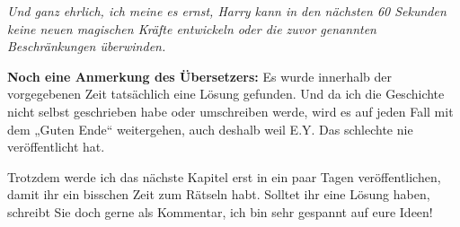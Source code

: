 \emph{Und ganz ehrlich, ich meine es ernst, Harry kann in den nächsten 60
Sekunden keine neuen magischen Kräfte entwickeln oder die zuvor genannten
Beschränkungen überwinden.}

\textbf{Noch eine Anmerkung des Übersetzers:}
Es wurde innerhalb der vorgegebenen Zeit tatsächlich eine Lösung gefunden. Und
da ich die Geschichte nicht selbst geschrieben habe oder umschreiben werde, wird
es auf jeden Fall mit dem „Guten Ende“ weitergehen, auch deshalb weil E.Y. Das
schlechte nie veröffentlicht hat.

Trotzdem werde ich das nächste Kapitel erst in ein paar Tagen veröffentlichen,
damit ihr ein bisschen Zeit zum Rätseln habt. Solltet ihr eine Lösung haben,
schreibt Sie doch gerne als Kommentar, ich bin sehr gespannt auf eure Ideen!

